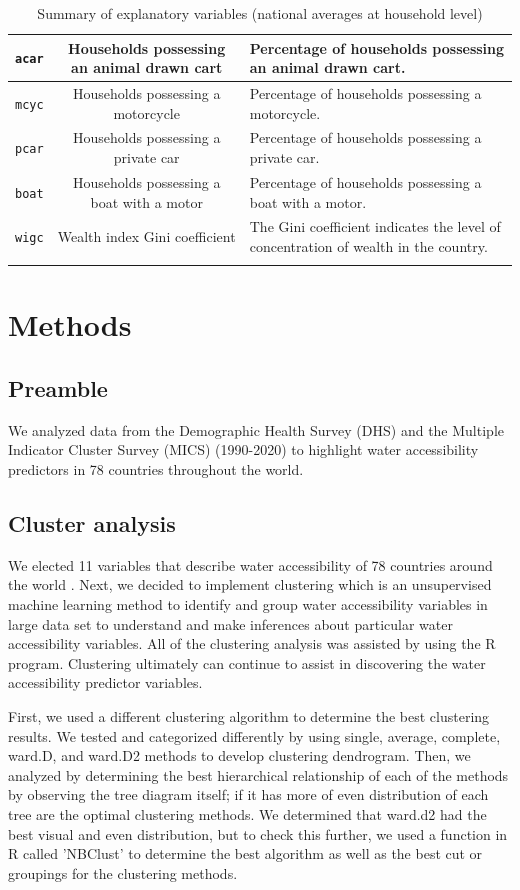 \documentclass[10pt,twoside]{article}
\numberwithin{equation}{section}
\newcommand{\?}{\stackrel{?}{=}}
\begin{document}
\begin{table}[h!]
\begin{tabular}{c c m{5cm}}
 \texttt{acar} & Households possessing an animal drawn cart
 & Percentage of households possessing an animal drawn cart.
\\\hline
 \texttt{mcyc} & Households possessing a motorcycle
 & Percentage of households possessing a motorcycle.
\\\hline
 \texttt{pcar} & Households possessing a private car
 & Percentage of households possessing a private car.
\\\hline
 \texttt{boat} & Households possessing a boat with a motor
 & Percentage of households possessing a boat with a motor.
\\\hline
 \texttt{wigc} & Wealth index Gini coefficient
 & The Gini coefficient indicates the level of concentration of wealth in the country.
\\\hline
 & \\\bottomrule
  \end{tabular}
  \caption{Summary of explanatory variables (national averages at household level)}
  \label{tab:summary}
\end{table}
 

\section*{Methods}

\subsection*{Preamble}
We analyzed data from the Demographic Health Survey (DHS) and the Multiple Indicator Cluster Survey (MICS) (1990-2020) to highlight water accessibility predictors in 78 countries throughout the world.

\subsection*{Cluster analysis}
We elected 11 variables that describe water accessibility of 78 countries around the world \citep{price2019difference}. Next, we decided to implement clustering which is an unsupervised machine learning method to identify and group water accessibility variables in large data set to understand and make inferences about particular water accessibility variables. All of the clustering analysis was assisted by using the R program. Clustering ultimately can continue to assist in discovering the water accessibility predictor variables. 

First, we used a different clustering algorithm to determine the best clustering results. We tested and categorized differently by using single, average, complete, ward.D, and ward.D2 methods to develop clustering dendrogram. Then, we analyzed by determining the best hierarchical relationship of each of the methods by observing the tree diagram itself; if it has more of even distribution of each tree are the optimal clustering methods. We determined that ward.d2 had the best visual and even distribution, but to check this further, we used a function in R called 'NBClust' to determine the best algorithm as well as the best cut or groupings for the clustering methods. 
\end{document}

